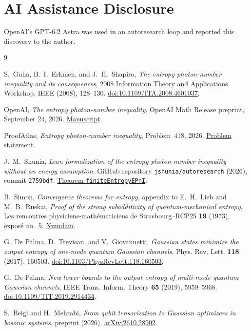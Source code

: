 \documentclass[11pt,letterpaper]{article}
\numberwithin{equation}{section}
\begin{document}
\section*{AI Assistance Disclosure}

OpenAI's GPT-6.2 Astra was used in an autoresearch loop and reported this discovery to the author.

\begingroup\small
\begin{thebibliography}{9}

S.~Guha, B.~I.~Erkmen, and J.~H.~Shapiro,
\emph{The entropy photon-number inequality and its consequences},
2008 Information Theory and Applications Workshop, IEEE (2008),
128--130. \href{https://doi.org/10.1109/ITA.2008.4601037}{doi:10.1109/ITA.2008.4601037}.

OpenAI, \emph{The entropy photon-number inequality}, OpenAI Math
Release preprint, September 24, 2026.
\href{https://github.com/openai/math/blob/4eaee87548250b2682affda7d05d947c05554bae/preprints/The-entropy-photon-number-inequality-September-24-2026/paper.pdf}{Manuscript}.

ProofAtlas, \emph{Entropy photon-number inequality}, Problem~418,
2026. \href{https://www.proofatlas.ai/open-problems/\#problem-top500-omission-w045049-entropy-photon-number-inequality}{Problem statement}.

J.~M.~Shunia, \emph{Lean formalization of the entropy photon-number
inequality without an energy assumption}, GitHub repository
\texttt{jshunia/autoresearch} (2026), commit \texttt{2759bdf}.
\href{https://github.com/jshunia/autoresearch/blob/2759bdf65c14f9d86906203fb697b69cd6572ff1/ProofAtlas-418/lean/FiniteEntropyEPnI.lean\#L41}{Theorem \texttt{finiteEntropyEPnI}}.

B.~Simon, \emph{Convergence theorems for entropy}, appendix to
E.~H.~Lieb and M.~B.~Ruskai, \emph{Proof of the strong subadditivity of
quantum-mechanical entropy}, Les rencontres physiciens-math\'ematiciens
de Strasbourg--RCP25 \textbf{19} (1973), expos\'e no.~5.
\href{https://www.numdam.org/item/RCP25_1973__19__A5_0/}{Numdam}.

G.~De Palma, D.~Trevisan, and V.~Giovannetti,
\emph{Gaussian states minimize the output entropy of one-mode quantum
Gaussian channels}, Phys. Rev. Lett. \textbf{118} (2017), 160503.
\href{https://doi.org/10.1103/PhysRevLett.118.160503}{doi:10.1103/PhysRevLett.118.160503}.

G.~De Palma, \emph{New lower bounds to the output entropy of multi-mode
quantum Gaussian channels}, IEEE Trans. Inform. Theory \textbf{65}
(2019), 5959--5968. \href{https://doi.org/10.1109/TIT.2019.2914434}{doi:10.1109/TIT.2019.2914434}.

S.~Beigi and H.~Mehrabi, \emph{From qubit tensorization to Gaussian
optimizers in bosonic systems}, preprint (2026).
\href{https://arxiv.org/abs/2610.28902}{arXiv:2610.28902}.

\end{thebibliography}
\endgroup
\end{document}
